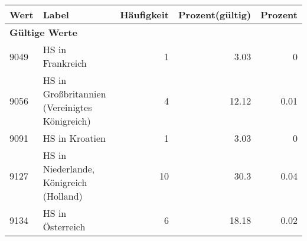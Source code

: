      \begin{longtable}{lXrrr}
     \toprule
     \textbf{Wert} & \textbf{Label} & \textbf{Häufigkeit} & \textbf{Prozent(gültig)} & \textbf{Prozent} \\
     \endhead
     \midrule
     \multicolumn{5}{l}{\textbf{Gültige Werte}}\\

     9049 &
     \multicolumn{1}{X}{ HS in Frankreich   } &


       \num{1} &
       \num[round-mode=places,round-precision=2]{3,03} &
         \num[round-mode=places,round-precision=2]{0} \\

     9056 &
     \multicolumn{1}{X}{ HS in Großbritannien (Vereinigtes Königreich)   } &


       \num{4} &
       \num[round-mode=places,round-precision=2]{12,12} &
         \num[round-mode=places,round-precision=2]{0,01} \\

     9091 &
     \multicolumn{1}{X}{ HS in Kroatien   } &


       \num{1} &
       \num[round-mode=places,round-precision=2]{3,03} &
         \num[round-mode=places,round-precision=2]{0} \\

     9127 &
     \multicolumn{1}{X}{ HS in Niederlande, Königreich (Holland)   } &


       \num{10} &
       \num[round-mode=places,round-precision=2]{30,3} &
         \num[round-mode=places,round-precision=2]{0,04} \\

     9134 &
     \multicolumn{1}{X}{ HS in Österreich   } &


       \num{6} &
       \num[round-mode=places,round-precision=2]{18,18} &
         \num[round-mode=places,round-precision=2]{0,02} \\


\end{longtable}
